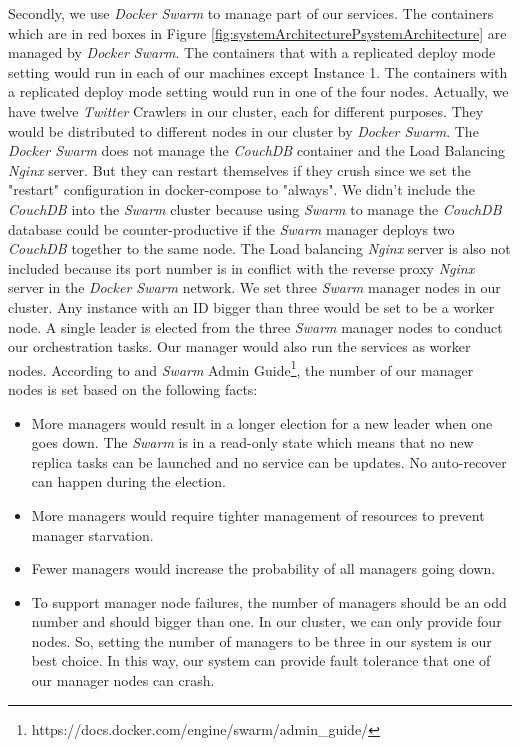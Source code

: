 \documentclass{article}
\begin{document}
Secondly, we use \textit{Docker Swarm} to manage part of our services. The containers which are in red boxes in Figure \ref{fig:systemArchitecturePsystemArchitecture} are managed by \textit{Docker Swarm}. The containers that with a replicated deploy mode setting would run in each of our machines except Instance 1. The containers with a replicated deploy mode setting would run in one of the four nodes. Actually, we have twelve \textit{Twitter} Crawlers in our cluster, each for different purposes. They would be distributed to different nodes in our cluster by \textit{Docker Swarm}. The \textit{Docker Swarm} does not manage the \textit{CouchDB} container and the Load Balancing \textit{Nginx} server. But they can restart themselves if they crush since we set the "restart" configuration in docker-compose to "always". We didn't include the \textit{CouchDB} into the \textit{Swarm} cluster because using \textit{Swarm} to manage the \textit{CouchDB} database could be counter-productive if the \textit{Swarm} manager deploys two \textit{CouchDB} together to the same node. The Load balancing \textit{Nginx} server is also not included because its port number is in conflict with the reverse proxy \textit{Nginx} server in the \textit{Docker Swarm} network. We set three \textit{Swarm} manager nodes in our cluster. Any instance with an ID bigger than three would be set to be a worker node. A single leader is elected from the three \textit{Swarm} manager nodes to conduct our orchestration tasks. Our manager would also run the services as worker nodes. According to \cite{pros-and-cons-of-running-all-docker-swarm-nodes-as-managers} and \textit{Swarm} Admin Guide\footnote{https://docs.docker.com/engine/swarm/admin\_guide/}, the number of our manager nodes is set based on the following facts:
\begin{itemize}
	\item More managers would result in a longer election for a new leader when one goes down. The \textit{Swarm} is in a read-only state which means that no new replica tasks can be launched and no service can be updates. No auto-recover can happen during the election.
	\item More managers would require tighter management of resources to prevent manager starvation.
	\item Fewer managers would increase the probability of all managers going down.
	\item To support manager node failures, the number of managers should be an odd number and should bigger than one. In our cluster, we can only provide four nodes. So, setting the number of managers to be three in our system is our best choice. In this way, our system can provide fault tolerance that one of our manager nodes can crash.
\end{itemize}
\end{document}

